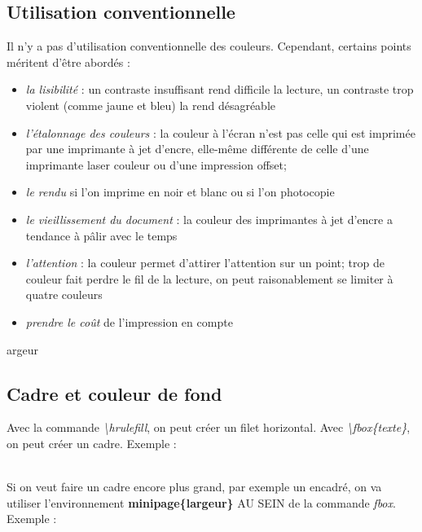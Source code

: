 \documentclass[a4paper, 10pt]{book}
\begin{document}
\subsection{Utilisation conventionnelle}

Il n'y a pas d'utilisation conventionnelle des couleurs. Cependant, certains points méritent d'être abordés :

\begin{itemize}
\item \textit{la lisibilité} : un contraste insuffisant rend difficile la lecture, un contraste trop violent (comme jaune et bleu) la rend désagréable
\item \textit{l'étalonnage des couleurs} : la couleur à l'écran n'est pas celle qui est imprimée par une imprimante à jet d'encre, elle-même différente de celle d'une imprimante laser couleur ou d'une impression offset;
\item \textit{le rendu} si l'on imprime en noir et blanc ou si l'on photocopie
\item \textit{le vieillissement du document} : la couleur des imprimantes à jet d'encre a tendance à pâlir avec le temps
\item \textit{l'attention} : la couleur permet d'attirer l'attention sur un point; trop de couleur fait perdre le fil de la lecture, on peut raisonablement se limiter à quatre couleurs
\item \textit{prendre le coût} de l'impression en compte
\end{itemize}argeur

\subsection{Cadre et couleur de fond}

Avec la commande \textit{\textbackslash hrulefill}, on peut créer un filet horizontal. Avec \textit{\textbackslash fbox\{texte\}}, on peut créer un cadre. Exemple : \\ \\
\hrulefill
{} 

Si on veut faire un cadre encore plus grand, par exemple un encadré, on va utiliser l'environnement \textbf{minipage\{largeur\}} AU SEIN de la commande \textit{fbox}. Exemple : \\ \\
\\
\end{document}
